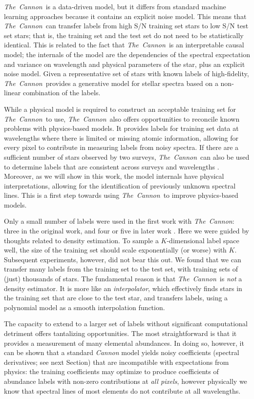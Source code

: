 \documentclass[12pt,preprint]{aastex6}
\newcommand{\project}[1]{\textsl{#1}}
\newcommand{\TheCannon}{\project{The~Cannon}}
\begin{document}
  \TheCannon\ is a data-driven model, 
but it differs from standard machine learning approaches because it contains an 
explicit noise model.  This means that \TheCannon\ can transfer labels from high
S/N training set stars to low S/N test set stars; that is, the training set and
the test set do not need to be statistically identical.  This is related to the
fact that \TheCannon\ is an interpretable causal model; the internals of the model are 
the dependencies of the spectral expectation and variance on wavelength and 
physical parameters of the star, plus an explicit noise model.  Given a representative set of stars with known
labels of high-fidelity, \TheCannon\ provides a generative model for stellar 
spectra based on a non-linear combination of the labels.  



While a physical model is required to construct an acceptable training set for
\TheCannon\ to use, \TheCannon\ also offers opportunities to reconcile known problems with physics-based 
models.  It provides labels for training set data at wavelengths where there is
limited or missing atomic information, allowing for every pixel to contribute in 
measuring labels from noisy spectra.  If there are a sufficient
number of stars observed by two surveys, \TheCannon\ can also be used to determine labels that
are consistent across surveys and wavelengths \citep{Ho_2016}.  Moreover, as we
will show in this work, the model internals have physical interpretations, 
allowing for the identification of previously unknown spectral lines.  This is
a first step towards using \TheCannon\ to improve physics-based models.


Only a small number of labels were used in the first work with \TheCannon: 
three in the original work, and four or five in later work \citep{tc, age, Ho_2016}. 
Here we were guided by thoughts related to density estimation. To sample a 
$K$-dimensional label space well, the size of the training set should scale
exponentially (or worse) with $K$.  Subsequent experiments, however, did not 
bear this out.  We found that we can transfer many labels from the training set 
to the test set, with training sets of (just) thousands of stars.  The fundamental 
reason is that \TheCannon\ is \emph{not} a density estimator.  It is more like 
an \emph{interpolator}, which effectively finds stars in the training set that
are close to the test star, and transfers labels, using a polynomial 
model as a smooth interpolation function.


The capacity to extend to a larger set of labels without significant
computational detriment offers tantalizing opportunities.  The most 
straightforward is that it provides a measurement of many elemental abundances.
In doing so, however, it can be shown that a standard \emph{Cannon} model yields
noisy coefficients (spectral derivatives; see next Section) that are incompatible with 
expectations from physics: the training coefficients may optimize to produce 
coefficients of abundance labels with non-zero 
contributions at \emph{all pixels}, however physically we know that spectral lines of most
elements do not contribute at all wavelengths. 
\end{document}

